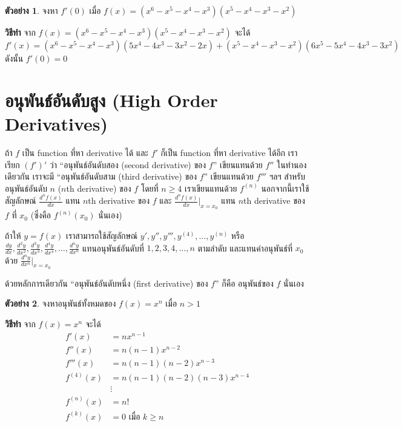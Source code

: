 \documentclass[
]{book}
\theoremstyle{definition}
\theoremstyle{definition}
\newtheorem{example}{ตัวอย่าง}[chapter]
\theoremstyle{definition}
\theoremstyle{definition}
\theoremstyle{remark}
\begin{document}
\begin{example}
จงหา \(f'(0)\) เมื่อ \(f(x) = (x^6 - x^5-x^4-x^3)(x^5-x^4-x^3-x^2)\)
\end{example}

\textbf{วิธีทำ} จาก \(f(x) = (x^6 - x^5-x^4-x^3)(x^5-x^4-x^3-x^2)\) จะได้
\[f'(x) = (x^6 - x^5-x^4-x^3)(5x^4-4x^3-3x^2-2x) +
    (x^5-x^4-x^3-x^2)(6x^5 - 5x^4-4x^3-3x^2)\] ดังนั้น \(f'(0) = 0\)

\section{อนุพันธ์อันดับสูง (High Order Derivatives)}\label{uxe2duxe19uxe1euxe19uxe18uxe2duxe19uxe14uxe1auxe2auxe07-high-order-derivatives}

ถ้า \(f\) เป็น function ที่หา derivative ได้ และ \(f'\) ก็เป็น function ที่หา
derivative ได้อีก เราเรียก \((f')'\) ว่า ``อนุพันธ์อันดับสอง (second derivative) ของ
\(f\)'' เขียนแทนด้วย \(f''\) ในทำนองเดียวกัน เราจะมี ``อนุพันธ์อันดับสาม (third
derivative) ของ \(f\)'' เขียนแทนด้วย \(f'''\) ฯลฯ สำหรับอนุพันธ์อันดับ \(n\) (\(n\)th
derivative) ของ \(f\) โดยที่ \(n \ge 4\) เราเขียนแทนด้วย \(f^{(n)}\)
นอกจากนี้เราใช้สัญลักษณ์ \(\frac{d^nf(x)}{dx}\) แทน \(n\)th derivative ของ \(f\) และ
\(\frac{d^nf(x)}{dx}|_{x=x_0}\) แทน \(n\)th derivative ของ \(f\) ที่ \(x_0\) (ซึ่งคือ
\(f^{(n)}(x_0)\) นั่นเอง)

ถ้าให้ \(y= f(x)\) เราสามารถใช้สัญลักษณ์
\(y', y'', y''', y^{(4)}, \ldots, y^{(n)}\) หรือ
\(\frac{dy}{dx}, \frac{d^2y}{dx^2}, \frac{d^3y}{dx^3}, \frac{d^4y}{dx^4}, \ldots,
\frac{d^ny}{dx^n}\) แทนอนุพันธ์อันดับที่ \(1,2,3,4,\ldots,n\) ตามลำดับ
และแทนค่าอนุพันธ์ที่ \(x_0\) ด้วย \(\frac{d^ny}{dx^n}|_{x=x_0}\)

ด้วยหลักการเดียวกัน ``อนุพันธ์อันดับหนึ่ง (first derivative) ของ \(f\)'' ก็คือ อนุพันธ์ของ
\(f\) นั่นเอง

\begin{example}
จงหาอนุพันธ์ทั้งหมดของ \(f(x) = x^n\) เมื่อ \(n > 1\)
\end{example}

\textbf{วิธีทำ} จาก \(f(x) = x^n\) จะได้ \begin{equation}   \begin{aligned}
        f'(x) &= n x^{n-1} \\
        f''(x) &= n(n-1) x^{n-2} \\
        f'''(x) &= n(n-1)(n-2) x^{n-3} \\
        f^{(4)}(x) &= n(n-1)(n-2)(n-3) x^{n-4} \\
          &\vdots \\
        f^{(n)}(x) &= n! \\
        f^{(k)}(x) &= 0 \text{ เมื่อ } k \ge n
  \end{aligned} \end{equation}
\end{document}
